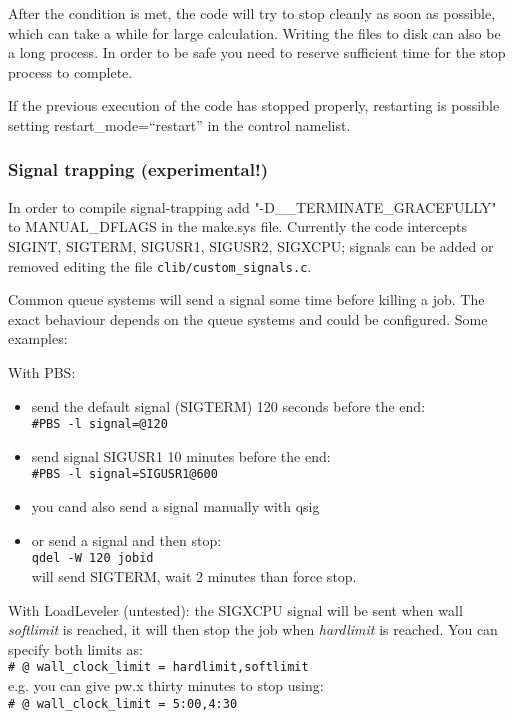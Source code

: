\documentclass[12pt,a4paper]{article}
\begin{document}
After the condition is met, the code will try to stop cleanly as soon as possible, which can take a while for large calculation. Writing the files to disk can also be a long process. In order to be safe you need to reserve sufficient time for the stop process to complete.

If the previous execution of the code has stopped properly, restarting is possible setting restart\_mode=``restart'' in the control namelist.

\subsubsection{Signal trapping (experimental!)}
In order to compile signal-trapping add \mbox{"-D\_\_TERMINATE\_GRACEFULLY"} to \mbox{MANUAL\_DFLAGS} in the make.sys file. Currently the code intercepts \mbox{SIGINT}, \mbox{SIGTERM}, \mbox{SIGUSR1}, \mbox{SIGUSR2}, \mbox{SIGXCPU}; signals can be added or removed editing the file {\tt clib/custom\_signals.c}.

Common queue systems will send a signal some time before killing a job. The exact behaviour depends on the queue systems and could be configured. Some examples:
  
With PBS:
\begin{itemize}
  \item send the default signal (\mbox{SIGTERM}) 120 seconds before the end:\\
  {\tt \#PBS -l signal=@120}

  \item send signal SIGUSR1 10 minutes before the end:\\
  {\tt \#PBS -l signal=SIGUSR1@600}

  \item you cand also send a signal manually with qsig
  \item or send a signal and then stop:\\
   {\tt qdel -W 120 jobid}\\
  will send SIGTERM, wait 2 minutes than force stop.
\end{itemize}

With LoadLeveler (untested): the \mbox{SIGXCPU} signal will be sent when wall \emph{softlimit} is reached, it will then stop the job when \emph{hardlimit} is reached. You can specify both limits as:\\
  {\tt \# @ wall\_clock\_limit = hardlimit,softlimit}\\
    e.g. you can give pw.x thirty minutes to stop using:\\
  {\tt \# @ wall\_clock\_limit = 5:00,4:30}\\
\end{document}
